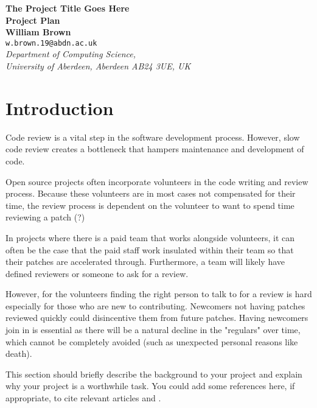 \documentclass[a4paper,12pt]{article}
\begin{document}
\begin{center}
{\Large\bf{The Project Title Goes Here}} \\
      \vspace{5.0mm}
{\Large\bf{Project Plan}} \\
      \vspace{8mm}
      {\large\bf{William Brown}}  \\
      \vspace{5.0mm}
       {\tt w.brown.19@abdn.ac.uk} \\
      \vspace{5.0mm}
      {\em Department of Computing Science,\\
       University of Aberdeen, Aberdeen AB24 3UE, UK} 
\end{center}


\section*{Introduction}

Code review is a vital step in the software development process. However, slow code review creates a bottleneck that hampers maintenance and development of code.

Open source projects often incorporate volunteers in the code writing and review process. Because these volunteers are in most cases not compensated for their time, the review process is dependent on the volunteer to want to spend time reviewing a patch (?)

In projects where there is a paid team that works alongside volunteers, it can often be the case that the paid staff work insulated within their team so that their patches are accelerated through. Furthermore, a team will likely have defined reviewers or someone to ask for a review.

However, for the volunteers finding the right person to talk to for a review is hard especially for those who are new to contributing. Newcomers not having patches reviewed quickly could disincentive them from future patches. Having newcomers join in is essential as there will be a natural decline in the "regulars" over time, which cannot be completely avoided (such as unexpected personal reasons like death).

This section should briefly describe the background to your
project and explain why your project is a worthwhile task.
You could add some references here, if appropriate, to cite 
relevant articles
\cite{wooldridge2002,shoham95} and \cite{garcia-camino2005}.
\end{document}
